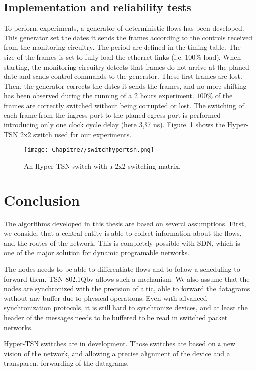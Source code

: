 \subsection{Implementation and reliability tests}

To perform experiments, a generator of deterministic flows has been developed. This generator set the dates it sends the frames according to the controls received from the monitoring circuitry. The period are defined in the timing table. The size of the frames is set to fully load the ethernet links (i.e. $100\%$ load).
When starting, the monitoring circuitry detects that frames do not arrive at the planed date and sends control commands to the generator. These first frames are lost. Then, the generator corrects the dates it sends the frames, and no more shifting has been observed during the running of a 2 hours experiment. $100\%$ of the frames are correctly switched without being corrupted or lost. The switching of each frame from the ingress port to the planed egress port is performed introducing only one clock cycle delay (here 3,87 ns).
Figure~\ref{fig:hypertsnswitch} shows the Hyper-TSN 2x2 switch used for our experiments.
\begin{center}

\begin{figure}[h]
  \centering
\texttt{[image: Chapitre7/switchhypertsn.png]}
\caption{ An Hyper-TSN switch with a 2x2 switching matrix.}
\label{fig:hypertsnswitch}
\end{figure}
\end{center}


\section*{Conclusion}

The algorithms developed in this thesis are based on several assumptions. First, we consider that a central entity is able to collect information about the flows, and the routes of the network. This is completely possible with SDN, which is one of the major solution for dynamic programable networks. 

The nodes needs to be able to differentiate flows and to follow a scheduling to forward them. TSN 802.1Qbv allows such a mechanism.
We also assume that the nodes are synchronized with the precision of a tic, able to forward the datagrams without any buffer due to physical operations. Even with advanced synchronization protocols, it is still hard to synchronize devices, and at least the header of the messages needs to be buffered to be read in switched packet networks.

Hyper-TSN switches are in development. Those switches are based on a new vision of the network, and allowing a precise alignment of the device and a transparent forwarding of the datagrams.